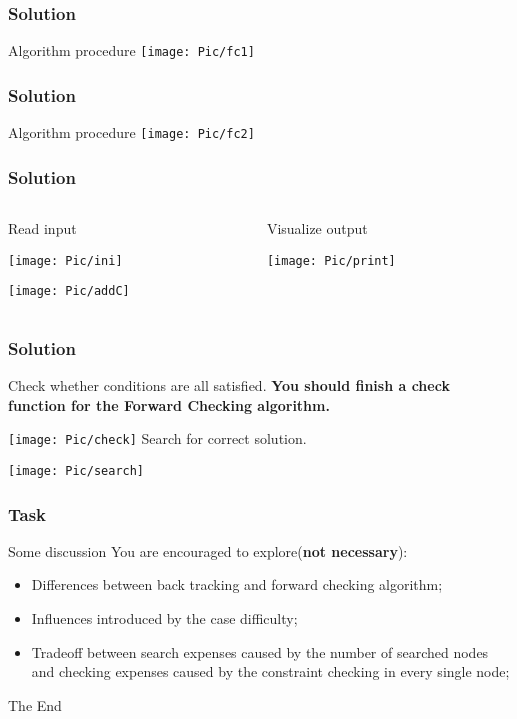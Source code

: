 \documentclass{beamer}
\begin{document}
\begin{frame}
  \frametitle{Solution}
  Algorithm procedure
  \texttt{[image: Pic/fc1]}
\end{frame}

\begin{frame}
  \frametitle{Solution}
  Algorithm procedure
  \texttt{[image: Pic/fc2]}
\end{frame}


\begin{frame}
  \frametitle{Solution}
  \begin{columns}
    \begin{column}{.5\linewidth}
      Read input
      
      \texttt{[image: Pic/ini]}

      
      \texttt{[image: Pic/addC]}
    \end{column}
    \begin{column}{.5\linewidth}
      Visualize output
      
      \texttt{[image: Pic/print]}
    \end{column}
  \end{columns}

\end{frame}

\begin{frame}
  \frametitle{Solution}
      Check whether conditions are all satisfied.
      \textbf{You should finish a check function for the Forward Checking algorithm.}
      
      
      \texttt{[image: Pic/check]}
      Search for correct solution.
      
      \texttt{[image: Pic/search]}

\end{frame}


\begin{frame}
  \frametitle{Task}
  \begin{block}{Some discussion}
	  You are encouraged to explore(\textbf{not necessary}):
    \begin{itemize}
      \item Differences between back tracking and forward checking algorithm;
	  \item Influences introduced by the case difficulty;
	  \item Tradeoff between search expenses caused by the number of searched nodes and checking expenses caused by the constraint checking in every single node;
    \end{itemize}
  \end{block}
\end{frame}


\begin{frame}
  \Huge{\centerline{The End}}
\end{frame}

\end{document}
